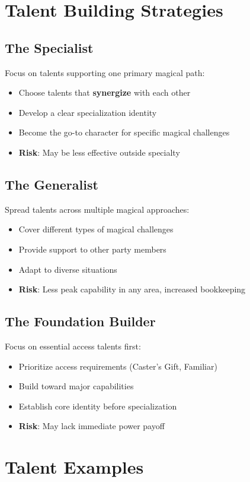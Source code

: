 \section{Talent Building Strategies}

\subsection*{The Specialist}
Focus on talents supporting one primary magical path:
\begin{itemize}
\item Choose talents that \textbf{synergize} with each other
\item Develop a clear specialization identity
\item Become the go-to character for specific magical challenges
\item \textbf{Risk}: May be less effective outside specialty
\end{itemize}

\subsection*{The Generalist}
Spread talents across multiple magical approaches:
\begin{itemize}
\item Cover different types of magical challenges
\item Provide support to other party members
\item Adapt to diverse situations
\item \textbf{Risk}: Less peak capability in any area, increased bookkeeping
\end{itemize}

\subsection*{The Foundation Builder}
Focus on essential access talents first:
\begin{itemize}
\item Prioritize access requirements (Caster's Gift, Familiar)
\item Build toward major capabilities
\item Establish core identity before specialization
\item \textbf{Risk}: May lack immediate power payoff
\end{itemize}

\section{Talent Examples}

